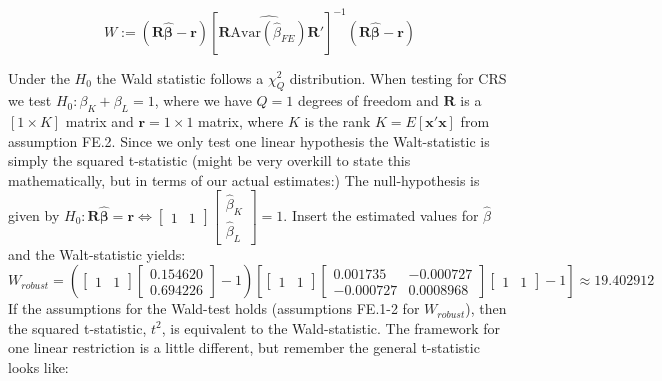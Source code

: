 \begin{equation*}
    W:=(\mathbf{R}\widehat{\boldsymbol{\beta}}-\mathbf{r})[\mathbf{R}\widehat{\text{Avar}(\widehat{\beta}_{FE})}\mathbf{R}']^{-1}(\mathbf{R} \boldsymbol{\widehat{\beta}}-\mathbf{r})
\end{equation*}

Under the $H_0$ the Wald statistic follows a $\chi^2_Q$ distribution. When testing for CRS we test $H_0:\beta_K+\beta_L=1$, where we have $Q=1$ degrees of freedom and  $\mathbf{R}$ is a $[1 \times K]$ matrix and $\textbf{r}=1 \times 1$ matrix, where $K$ is the rank $K=E[\textbf{x}'\textbf{x}]$  from assumption FE.2. Since we only test one linear hypothesis the Walt-statistic is simply the squared t-statistic (might be very overkill to state this mathematically, but in terms of our actual estimates:)
The null-hypothesis is given by  $H_0: \mathbf{R}\boldsymbol{\hat{\beta}}=\mathbf{r}\Leftrightarrow \begin{bmatrix}1&1 \end{bmatrix} \begin{bmatrix}\hat{\beta}_K\\ \hat{\beta}_L \end{bmatrix}=1$. Insert the estimated values for $\hat{\beta}$ and the Walt-statistic yields:
\begin{equation*}
    W_{robust}= (\begin{bmatrix}1&1 \end{bmatrix} 
    \begin{bmatrix} 0.154620 \\ 0.694226 \end{bmatrix}-1)[\begin{bmatrix}1&1 \end{bmatrix}
    \begin{bmatrix}
        0.001735 & -0.000727 \\ 
        -0.000727 & 0.0008968
    \end{bmatrix} \begin{bmatrix}1&1 \end{bmatrix}-1]\approx 19.402912
\end{equation*}
If the assumptions for the Wald-test holds (assumptions FE.1-2 for $W_{robust}$), then the squared t-statistic, $t^2$, is equivalent to the Wald-statistic. The framework for one linear restriction is a little different, but remember the general t-statistic looks like:


